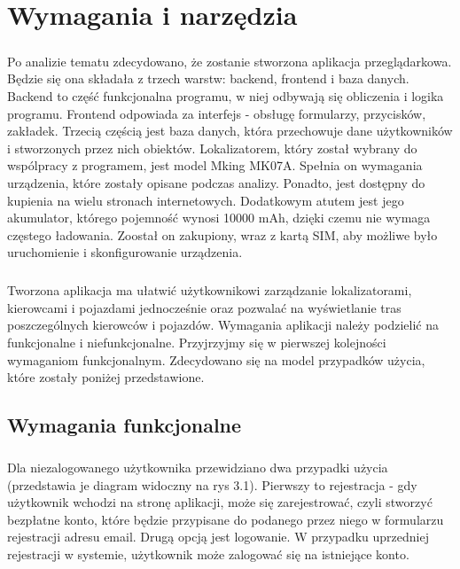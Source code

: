 \chapter{Wymagania i narzędzia}
\label{ch:wymagania-i-narzedzia}

\paragraph{}
Po analizie tematu zdecydowano, że zostanie stworzona aplikacja przeglądarkowa. Będzie się ona składała z trzech warstw: backend, frontend i baza danych. Backend to część funkcjonalna programu, w niej odbywają się obliczenia i logika programu. Frontend odpowiada za interfejs - obsługę formularzy, przycisków, zakładek. Trzecią częścią jest baza danych, która przechowuje dane użytkowników i stworzonych przez nich obiektów. Lokalizatorem, który został wybrany do wspólpracy z programem, jest model Mking MK07A. Spełnia on wymagania urządzenia, które zostały opisane podczas analizy. Ponadto, jest dostępny do kupienia na wielu stronach internetowych. Dodatkowym atutem jest jego akumulator, którego pojemność wynosi 10000 mAh, dzięki czemu nie wymaga częstego ładowania. Zoostał on zakupiony, wraz z kartą SIM, aby możliwe było uruchomienie i skonfigurowanie urządzenia.

\paragraph{}
Tworzona aplikacja ma ułatwić użytkownikowi zarządzanie lokalizatorami, kierowcami i pojazdami jednocześnie oraz pozwalać na wyświetlanie tras poszczególnych kierowców i pojazdów. Wymagania aplikacji należy podzielić na funkcjonalne i niefunkcjonalne. Przyjrzyjmy się w pierwszej kolejności wymaganiom funkcjonalnym. Zdecydowano się na model przypadków użycia, które zostały poniżej przedstawione.

\section{Wymagania funkcjonalne}
\paragraph{}
Dla niezalogowanego użytkownika przewidziano dwa przypadki użycia (przedstawia je diagram widoczny na rys 3.1). Pierwszy to  rejestracja - gdy użytkownik wchodzi na stronę aplikacji, może się zarejestrować, czyli stworzyć bezpłatne konto, które będzie przypisane do podanego przez niego w formularzu rejestracji adresu email. Drugą opcją jest  logowanie. W przypadku uprzedniej rejestracji w systemie, użytkownik może zalogować się na istniejące konto.

